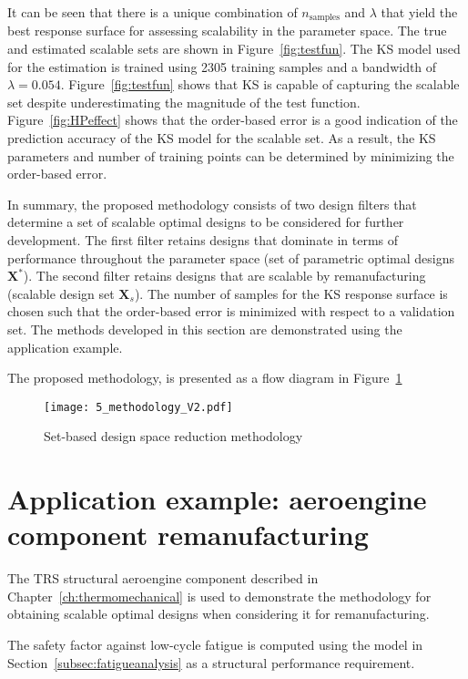 It can be seen that there is a unique combination of $n_{\textrm{samples}}$ and $\lambda$ that yield the best response surface for assessing scalability in the parameter space. The true and estimated scalable sets are shown in Figure~\ref{fig:testfun}. The \ac{KS} model used for the estimation is trained using 2305 training samples and a bandwidth of $\lambda = 0.054$.
Figure~\ref{fig:testfun} shows that \ac{KS} is capable of capturing the scalable set despite underestimating the magnitude of the test function. Figure~\ref{fig:HPeffect} shows that the order-based error is a good indication of the prediction accuracy of the \ac{KS} model for the scalable set. As a result, the \ac{KS} parameters and number of training points can be determined by minimizing the order-based error.

In summary, the proposed methodology consists of two design filters that determine a set of scalable optimal designs to be considered for further development. The first filter retains designs that dominate in terms of performance throughout the parameter space (set of parametric optimal designs $\mathbf{X}^*$). The second filter retains designs that are scalable by remanufacturing (scalable design set $\mathbf{X}_s$). The number of samples for the \ac{KS} response surface is chosen such that the order-based error is minimized with respect to a validation set. The methods developed in this section are demonstrated using the application example.

The proposed methodology, is presented as a flow diagram in Figure~\ref{fig:SBDmethods}

\begin{figure}[h]
	\centering
	\texttt{[image: 5\_methodology\_V2.pdf]}
	\caption{ \label{fig:SBDmethods} Set-based design space reduction methodology}
\end{figure}

\section{Application example: aeroengine component remanufacturing} \label{sec:SBDusecase}

The \ac{TRS} structural aeroengine component described in Chapter~\ref{ch:thermomechanical} is used to demonstrate the methodology for obtaining scalable optimal designs when considering it for remanufacturing.

The safety factor against low-cycle fatigue is computed using the model in Section~\ref{subsec:fatigueanalysis} as a structural performance requirement.

